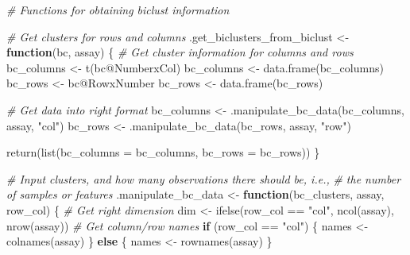 \documentclass[
]{book}
\newenvironment{Shaded}{\begin{snugshade}}{\end{snugshade}}
\newcommand{\AttributeTok}[1]{\textcolor[rgb]{0.77,0.63,0.00}{#1}}
\newcommand{\CommentTok}[1]{\textcolor[rgb]{0.56,0.35,0.01}{\textit{#1}}}
\newcommand{\ControlFlowTok}[1]{\textcolor[rgb]{0.13,0.29,0.53}{\textbf{#1}}}
\newcommand{\FunctionTok}[1]{\textcolor[rgb]{0.00,0.00,0.00}{#1}}
\newcommand{\NormalTok}[1]{#1}
\newcommand{\OtherTok}[1]{\textcolor[rgb]{0.56,0.35,0.01}{#1}}
\newcommand{\SpecialCharTok}[1]{\textcolor[rgb]{0.00,0.00,0.00}{#1}}
\newcommand{\StringTok}[1]{\textcolor[rgb]{0.31,0.60,0.02}{#1}}
\begin{document}
\begin{Shaded}
\begin{Highlighting}[]
\CommentTok{\# Functions for obtaining biclust information}

\CommentTok{\# Get clusters for rows and columns}
\NormalTok{.get\_biclusters\_from\_biclust }\OtherTok{\textless{}{-}} \ControlFlowTok{function}\NormalTok{(bc, assay) \{}
    \CommentTok{\# Get cluster information for columns and rows}
\NormalTok{    bc\_columns }\OtherTok{\textless{}{-}} \FunctionTok{t}\NormalTok{(bc}\SpecialCharTok{@}\NormalTok{NumberxCol)}
\NormalTok{    bc\_columns }\OtherTok{\textless{}{-}} \FunctionTok{data.frame}\NormalTok{(bc\_columns)}
\NormalTok{    bc\_rows }\OtherTok{\textless{}{-}}\NormalTok{ bc}\SpecialCharTok{@}\NormalTok{RowxNumber}
\NormalTok{    bc\_rows }\OtherTok{\textless{}{-}} \FunctionTok{data.frame}\NormalTok{(bc\_rows)}

    \CommentTok{\# Get data into right format}
\NormalTok{    bc\_columns }\OtherTok{\textless{}{-}} \FunctionTok{.manipulate\_bc\_data}\NormalTok{(bc\_columns, assay, }\StringTok{"col"}\NormalTok{)}
\NormalTok{    bc\_rows }\OtherTok{\textless{}{-}} \FunctionTok{.manipulate\_bc\_data}\NormalTok{(bc\_rows, assay, }\StringTok{"row"}\NormalTok{)}
    
    \FunctionTok{return}\NormalTok{(}\FunctionTok{list}\NormalTok{(}\AttributeTok{bc\_columns =}\NormalTok{ bc\_columns, }\AttributeTok{bc\_rows =}\NormalTok{ bc\_rows))}
\NormalTok{\}}

\CommentTok{\# Input clusters, and how many observations there should be, i.e.,}
\CommentTok{\# the number of samples or features}
\NormalTok{.manipulate\_bc\_data }\OtherTok{\textless{}{-}} \ControlFlowTok{function}\NormalTok{(bc\_clusters, assay, row\_col) \{}
    \CommentTok{\# Get right dimension}
\NormalTok{    dim }\OtherTok{\textless{}{-}} \FunctionTok{ifelse}\NormalTok{(row\_col }\SpecialCharTok{==} \StringTok{"col"}\NormalTok{, }\FunctionTok{ncol}\NormalTok{(assay), }\FunctionTok{nrow}\NormalTok{(assay))}
    \CommentTok{\# Get column/row names}
    \ControlFlowTok{if}\NormalTok{ (row\_col }\SpecialCharTok{==} \StringTok{"col"}\NormalTok{) \{}
\NormalTok{        names }\OtherTok{\textless{}{-}} \FunctionTok{colnames}\NormalTok{(assay)}
\NormalTok{    \} }\ControlFlowTok{else}\NormalTok{ \{}
\NormalTok{        names }\OtherTok{\textless{}{-}} \FunctionTok{rownames}\NormalTok{(assay)}
\NormalTok{    \}}


\end{Highlighting}
\end{Shaded}
\end{document}
